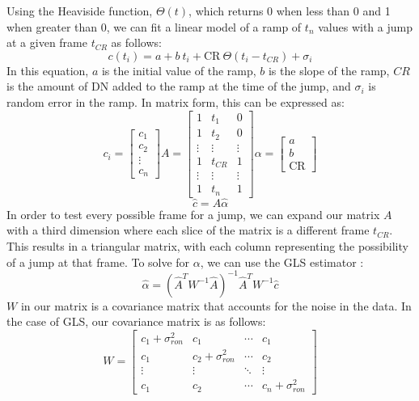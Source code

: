 Using the Heaviside function, $\Theta(t)$, which returns 0 when less than 0 and 1 when greater than 0, we can fit a linear model of a ramp of $t_n$ values with a jump at a given frame $t_{CR}$ as follows:
\begin{equation}
    c(t_i) = a + b\ t_i + \text{CR}\ \Theta(t_i - t_{CR}) + \sigma_i
\end{equation}
In this equation, $a$ is the initial value of the ramp, $b$ is the slope of the ramp, $CR$ is the amount of DN added to the ramp at the time of the jump, and $\sigma_i$ is random error in the ramp.
In matrix form, this can be expressed as:
\begin{equation}
    c_i = \begin{bmatrix}
        c_1 \\
        c_2 \\
        \vdots \\
        c_n
    \end{bmatrix}
    A = \begin{bmatrix}
        1 & t_1 & 0 \\
        1 & t_2 & 0 \\
        \vdots & \vdots & \vdots \\
        1 & t_{CR} & 1 \\
        \vdots & \vdots & \vdots \\
        1 & t_n & 1
    \end{bmatrix}
    \alpha = \begin{bmatrix}
        a \\ b \\ \text{CR}
    \end{bmatrix}
\end{equation}
\begin{equation}
    \hat{c} = A \hat{\alpha}
\end{equation}
In order to test every possible frame for a jump, we can expand our matrix $A$ with a third dimension where each slice of the matrix is a different frame $t_{CR}$.
This results in a triangular matrix, with each column representing the possibility of a jump at that frame.
To solve for $\alpha$, we can use the GLS estimator \parencite{robberto2014generalized}:
\begin{equation}
    \hat{\alpha} = (\hat{A}^T W^{-1} \hat{A})^{-1} \hat{A}^T W^{-1} \hat{c}
\end{equation}
$W$ in our matrix is a covariance matrix that accounts for the noise in the data.
In the case of GLS, our covariance matrix is as follows:
\begin{equation}
    W = \begin{bmatrix}
        c_1 + \sigma_{ron}^2 & c_1 & \cdots & c_1 \\
        c_1 & c_2 + \sigma_{ron}^2 & \cdots & c_2 \\
        \vdots & \vdots & \ddots & \vdots \\
        c_1 & c_2 & \cdots & c_n + \sigma_{ron}^2
\end{bmatrix}
\end{equation}
